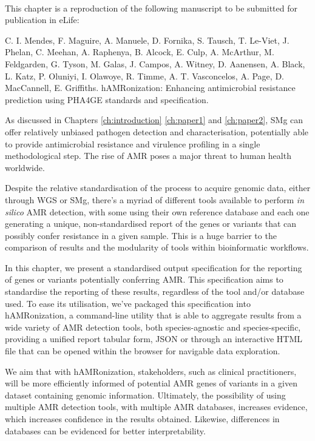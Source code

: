 \mbox{}\\
\vspace{8cm}


This chapter is a reproduction of the following manuscript to be submitted for publication in eLife:

C. I. Mendes, F. Maguire, A. Manuele, D. Fornika, S. Tausch, T. Le-Viet, J. Phelan, C. Meehan, A. Raphenya, B. Alcock, E. Culp, A. McArthur, M. Feldgarden, G. Tyson, M. Galas, J. Campos, A. Witney, D. Aanensen, A. Black, L. Katz, P. Oluniyi, I. Olawoye, R. Timme, A. T. Vasconcelos, A. Page, D. MacCannell, E. Griffiths. 
hAMRonization: Enhancing antimicrobial resistance prediction using PHA4GE standards and specification. 

As discussed in Chapters \ref{ch:introduction} \ref{ch:paper1} and \ref{ch:paper2}, \ac{SMg} can offer relatively unbiased pathogen detection and characterisation, potentially able to provide antimicrobial resistance and virulence profiling in a single methodological step. The rise of \ac{AMR} poses a major threat to human health worldwide.

Despite the relative standardisation of the process to acquire genomic data, either through \ac{WGS} or \ac{SMg}, there's a myriad of different tools available to perform \textit{in silico} \ac{AMR} detection, with some using their own reference database and each one generating a unique, non-standardised report of the genes or variants that can possibly confer resistance in a given sample. This is a huge barrier to the comparison
of results and the modularity of tools within bioinformatic workflows.

In this chapter, we present a standardised output specification for the reporting of genes or variants potentially conferring \ac{AMR}. This specification aims to standardise the reporting of these results, regardless of the tool and/or database used. To ease its utilisation, we've packaged this specification into hAMRonization, a command-line utility that is able to aggregate results from a wide variety of \ac{AMR} detection tools, both species-agnostic and species-specific, providing a unified report tabular form, JSON or through an interactive HTML file that can be opened within the browser for navigable data exploration. 

We aim that with hAMRonization, stakeholders, such as clinical practitioners, will be more efficiently informed of potential \ac{AMR} genes of variants in a given dataset containing genomic information. Ultimately, the possibility of using multiple \ac{AMR} detection tools, with multiple \ac{AMR} databases, increases evidence, which increases confidence in the results obtained. Likewise, differences in databases can be evidenced for better interpretability. 

